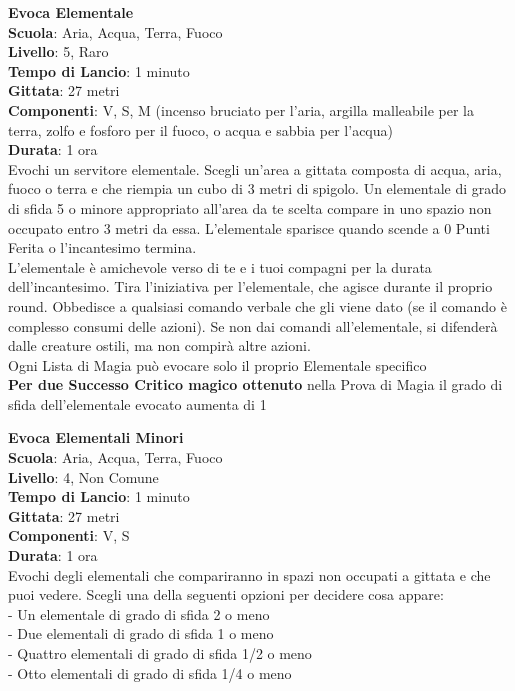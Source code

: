 \begin{multicols}{2}
\medskip\textbf{Evoca Elementale}\\
\textbf{Scuola}: Aria, Acqua, Terra, Fuoco\\
\textbf{Livello}: 5, Raro\\
\textbf{Tempo di Lancio}: 1 minuto\\
\textbf{Gittata}: 27 metri\\
\textbf{Componenti}: V, S, M (incenso bruciato per l'aria, argilla malleabile per la terra, zolfo e fosforo per il fuoco, o acqua e sabbia per l'acqua) \\
\textbf{Durata}: 1 ora\\
Evochi un servitore elementale. Scegli un'area a gittata composta di acqua, aria, fuoco o terra e che riempia un cubo di 3 metri di spigolo. Un elementale di grado di sfida 5 o minore appropriato all'area da te scelta compare in uno spazio non occupato entro 3 metri da essa. L'elementale sparisce quando scende a 0 Punti Ferita o l'incantesimo termina.\\
L'elementale è amichevole verso di te e i tuoi compagni per la durata dell'incantesimo. Tira l'iniziativa per l'elementale, che agisce durante il proprio round. Obbedisce a qualsiasi comando verbale che gli viene dato (se il comando è complesso consumi delle azioni). Se non dai comandi all'elementale, si difenderà dalle creature ostili, ma non compirà altre azioni.\\
Ogni Lista di Magia può evocare solo il proprio Elementale specifico\\
\textbf{Per due Successo Critico magico ottenuto} nella Prova di Magia il grado di sfida dell'elementale evocato aumenta di 1

\medskip\textbf{Evoca Elementali Minori}\\
\textbf{Scuola}: Aria, Acqua, Terra, Fuoco\\
\textbf{Livello}: 4, Non Comune\\
\textbf{Tempo di Lancio}: 1 minuto\\
\textbf{Gittata}: 27 metri\\
\textbf{Componenti}: V, S\\
\textbf{Durata}: 1 ora\\
Evochi degli elementali che compariranno in spazi non occupati a gittata e che puoi vedere. Scegli una della seguenti opzioni per decidere cosa appare:\\

- Un elementale di grado di sfida 2 o meno\\
- Due elementali di grado di sfida 1 o meno\\
- Quattro elementali di grado di sfida 1/2 o meno\\
- Otto elementali di grado di sfida 1/4 o meno\\


\end{multicols}
